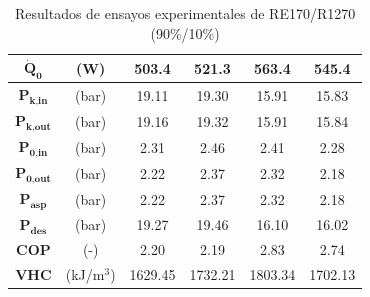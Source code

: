 \documentclass[../main.tex]{subfiles}
\begin{document}
\begin{table}[ht]
\begin{tabular}{cc|c|c|c|c|}
\hline
\multicolumn{1}{|c}{$\dot{\textbf{Q}}_\textbf{0}$} & (W) & 503.4 & 521.3 & 563.4 & 545.4 \\
\hline
\multicolumn{1}{|c}{$\textbf{P}_\textbf{k,in}$} & (bar) & 19.11 & 19.30 & 15.91 & 15.83 \\
\hline
\multicolumn{1}{|c}{$\textbf{P}_\textbf{k,out}$} & (bar) & 19.16 & 19.32 & 15.91 & 15.84 \\
\hline
\multicolumn{1}{|c}{$\textbf{P}_\textbf{0,in}$} & (bar) & 2.31 & 2.46 & 2.41 & 2.28 \\
\hline
\multicolumn{1}{|c}{$\textbf{P}_\textbf{0,out}$} & (bar) & 2.22 & 2.37 & 2.32 & 2.18 \\
\hline
\multicolumn{1}{|c}{$\textbf{P}_\textbf{asp}$} & (bar) & 2.22 & 2.37 & 2.32 & 2.18 \\
\hline
\multicolumn{1}{|c}{$\textbf{P}_\textbf{des}$} & (bar) & 19.27 & 19.46 & 16.10 & 16.02 \\
\hline
\multicolumn{1}{|c}{$\textbf{COP}$} & (-) & 2.20 & 2.19 & 2.83 & 2.74 \\
\hline
\multicolumn{1}{|c}{$\textbf{VHC}$} & (kJ/m$^3$) & 1629.45 & 1732.21 & 1803.34 & 1702.13 \\
\hline
\end{tabular}
\caption{\centering Resultados de ensayos experimentales de RE170/R1270 (90\%/10\%)}
\label{tab:RE170_R1270_90_10_anexo}
\end{table}
\end{document}
